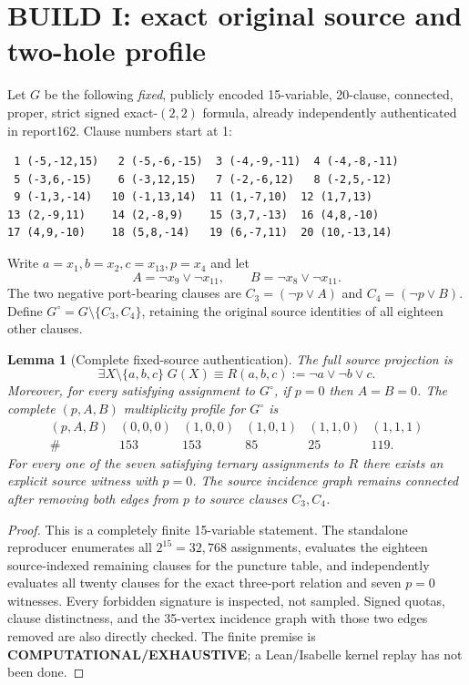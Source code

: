 \documentclass[11pt]{article}
\newtheorem{lemma}[theorem]{Lemma}
\begin{document}
\section{BUILD I: exact original source and two-hole profile}
Let $G$ be the following \emph{fixed}, publicly encoded 15-variable, 20-clause, connected, proper, strict signed exact-$(2,2)$ formula, already independently authenticated in report162. Clause numbers start at 1:
\begin{verbatim}
 1 (-5,-12,15)   2 (-5,-6,-15)  3 (-4,-9,-11)  4 (-4,-8,-11)
 5 (-3,6,-15)    6 (-3,12,15)   7 (-2,-6,12)   8 (-2,5,-12)
 9 (-1,3,-14)   10 (-1,13,14)  11 (1,-7,10)  12 (1,7,13)
13 (2,-9,11)    14 (2,-8,9)    15 (3,7,-13)  16 (4,8,-10)
17 (4,9,-10)    18 (5,8,-14)   19 (6,-7,11)  20 (10,-13,14)
\end{verbatim}
Write $a=x_1,b=x_2,c=x_{13},p=x_4$ and let
\[
 A=\neg x_9\vee\neg x_{11},\qquad
 B=\neg x_8\vee\neg x_{11}.
\]
The two negative port-bearing clauses are $C_3=(\neg p\vee A)$ and $C_4=(\neg p\vee B)$. Define $G^\circ=G\setminus\{C_3,C_4\}$, retaining the original source identities of all eighteen other clauses.

\begin{lemma}[Complete fixed-source authentication]\label{lem:fixed}
The full source projection is
\[
 \exists X\setminus\{a,b,c\}\;G(X)
 \equiv R(a,b,c):=\neg a\vee\neg b\vee c.
\]
Moreover, for every satisfying assignment to $G^\circ$, if $p=0$ then $A=B=0$. The complete $(p,A,B)$ multiplicity profile for $G^\circ$ is
\[
 \begin{array}{c|rrrrr}
 (p,A,B)&(0,0,0)&(1,0,0)&(1,0,1)&(1,1,0)&(1,1,1)\\\hline
 \#&153&153&85&25&119.
 \end{array}
\]
For every one of the seven satisfying ternary assignments to $R$ there exists an explicit source witness with $p=0$. The source incidence graph remains connected after removing both edges from $p$ to source clauses $C_3,C_4$.
\end{lemma}
\begin{proof}
This is a completely finite 15-variable statement. The standalone reproducer enumerates all $2^{15}=32,768$ assignments, evaluates the eighteen source-indexed remaining clauses for the puncture table, and independently evaluates all twenty clauses for the exact three-port relation and seven $p=0$ witnesses. Every forbidden signature is inspected, not sampled. Signed quotas, clause distinctness, and the 35-vertex incidence graph with those two edges removed are also directly checked. The finite premise is \textbf{COMPUTATIONAL/EXHAUSTIVE}; a Lean/Isabelle kernel replay has not been done.
\end{proof}
\end{document}
